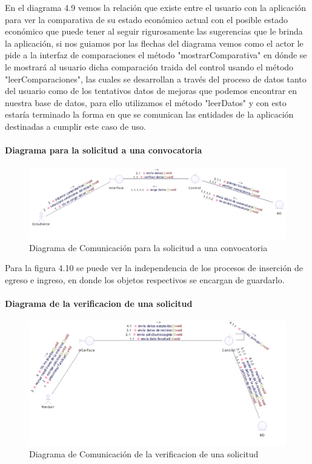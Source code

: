 En el diagrama 4.9 vemos la relación que existe entre el usuario con la aplicación para ver la comparativa de su estado económico actual con el posible estado económico que puede tener al seguir rigurosamente las sugerencias que le brinda la aplicación, si nos guiamos por las flechas del diagrama vemos como el actor le pide a la interfaz de comparaciones el método "mostrarComparativa" en dónde se le mostrará al usuario dicha comparación traida del control usando el método "leerComparaciones", las cuales se desarrollan a través del proceso de datos tanto del usuario como de los tentativos datos de mejoras que podemos encontrar en nuestra base de datos, para ello utilizamos el método "leerDatos" y con esto estaría terminado la forma en que se comunican las entidades de la aplicación destinadas a cumplir este caso de uso.

\paragraph{Diagrama para la solicitud a una convocatoria}
\begin{figure}[H]
	\centering
	\includegraphics[width=1\linewidth]{parte2/imgs/DiagramaComunicacion/ComSoliConv}
	\caption[Diagrama de Comunicacion Solicitud a Convocatoria]{Diagrama de Comunicación para la solicitud a una convocatoria}
	\label{fig:diagramaDeComunicacion2}
\end{figure}

Para la figura 4.10 se puede ver la independencia de los procesos de inserción de egreso e ingreso, en donde los objetos respectivos se encargan de guardarlo.

\paragraph{Diagrama de la verificacion de una solicitud}
\begin{figure}[H]
	\centering
	\includegraphics[width=1\linewidth]{parte2/imgs/DiagramaComunicacion/Comver}
	\caption[Diagrama de Comunicacion verificacion solicitud]{Diagrama de Comunicación de la  verificacion de una solicitud}
	\label{fig:diagramaDeComunicacion4}
\end{figure}

